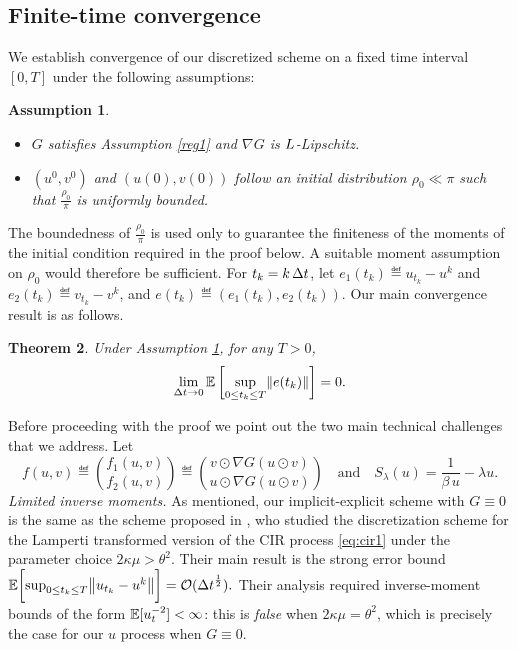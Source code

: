 \documentclass[11pt, twoside]{report}
\newtheorem{theorem}{Theorem}[section]
\newtheorem{assumption}[theorem]{Assumption}
\begin{document}
\subsection{Finite-time convergence}
We  establish convergence  of our discretized scheme on a fixed time interval $[0,T]$ under the following assumptions:
\begin{assumption}\label{reg3} 
\begin{itemize}
    \item[(i)] $G$ satisfies Assumption \ref{reg1} and $\nabla G$ is $L$-Lipschitz.
    \item[(ii)] $(u^0,v^0)$ and $(u(0),v(0))$ follow an initial distribution $\rho_0\ll \pi $ such that $\frac{\rho_0}{\pi}$ is uniformly bounded.
\end{itemize}
\end{assumption}
The boundedness of $\frac{\rho_0}{\pi}$ is used only to guarantee the finiteness of the moments of the initial condition required in the proof below. A suitable moment assumption on $\rho_0$ would therefore be sufficient. For $t_k=k\,{\Delta t}$, let  $e_1(t_k) \eqdef u_{t_k} - u^k$ and $e_2(t_k) \eqdef v_{t_k} - v^k$, and $e(t_k) \eqdef (e_1(t_k), e_2(t_k)) $. Our main convergence result is as follows.
\begin{theorem}\label{thm:num_conv}
Under Assumption \ref{reg3}, for any $T>0$,
$$
\lim_{\deltat \to 0} \EE\left[\sup_{0\leq t_k \leq T} \norm{e(t_k)}\right] = 0.
$$
\end{theorem}
Before proceeding with the proof we point out the two main technical challenges that we address. Let 
\begin{equation}\label{eq:f}
    f(u,v) \eqdef \binom{f_1(u,v)}{f_2(u,v)} \eqdef \binom{v\odot \nabla G(u\odot v)}{u\odot \nabla G(u\odot v)}
    \quad \text{and}\quad
    S_\lambda(u) = \frac{1}{\beta\, u} - \lambda u.
\end{equation}
\textit{Limited inverse moments.} As mentioned, our implicit-explicit scheme with $G\equiv 0$ is  the same as the scheme proposed in \cite{Dereich2011-tp}, who studied the discretization scheme for the Lamperti transformed version of the CIR process \eqref{eq:cir1} under the parameter choice $2\kappa\mu>\theta^2$. Their main result is the strong error bound $\EE\biggl[\sup_{0\leq t_k \leq T} \norm{ u_{t_k} - u^k}\biggr] = \Oo(\deltat^{\frac12}).$ Their analysis required inverse-moment bounds of the form $\mathbb{E}[u_t^{-2}]<\infty$: this is \textit{false} when $2\kappa\mu = \theta^2$, which is precisely the case for our $u$ process when $G\equiv 0$. 
\end{document}
